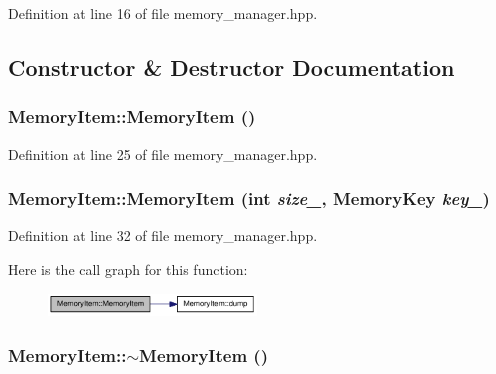 Definition at line 16 of file memory\_\-manager.hpp.

\subsection{Constructor \& Destructor Documentation}
\hypertarget{struct_memory_item_afa0c66e4afaa19a315a47cb61482d18c}{
\subsubsection[{MemoryItem}]{\setlength{\rightskip}{0pt plus 5cm}MemoryItem::MemoryItem ()}}
\label{struct_memory_item_afa0c66e4afaa19a315a47cb61482d18c}


Definition at line 25 of file memory\_\-manager.hpp.\hypertarget{struct_memory_item_a86015b342bb2d888d7458e1c7c8da71e}{
\subsubsection[{MemoryItem}]{\setlength{\rightskip}{0pt plus 5cm}MemoryItem::MemoryItem (int {\em size\_\-}, \/  {\bf MemoryKey} {\em key\_\-})}}
\label{struct_memory_item_a86015b342bb2d888d7458e1c7c8da71e}


Definition at line 32 of file memory\_\-manager.hpp.

Here is the call graph for this function:\nopagebreak
\begin{figure}[H]
\begin{center}
\leavevmode
\includegraphics[width=157pt]{struct_memory_item_a86015b342bb2d888d7458e1c7c8da71e_cgraph}
\end{center}
\end{figure}
\hypertarget{struct_memory_item_a51966f62038798bfa49be9ae14e99691}{
\subsubsection[{$\sim$MemoryItem}]{\setlength{\rightskip}{0pt plus 5cm}MemoryItem::$\sim$MemoryItem ()}}
\label{struct_memory_item_a51966f62038798bfa49be9ae14e99691}


